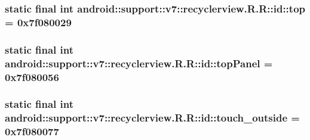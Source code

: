 \hypertarget{classandroid_1_1support_1_1v7_1_1recyclerview_1_1_r_1_1id_87a5e014a724cf78acf722314e58c9ba}{
\subsubsection[{top}]{\setlength{\rightskip}{0pt plus 5cm}static final int android::support::v7::recyclerview.R.R::id::top = 0x7f080029}}
\label{classandroid_1_1support_1_1v7_1_1recyclerview_1_1_r_1_1id_87a5e014a724cf78acf722314e58c9ba}


\hypertarget{classandroid_1_1support_1_1v7_1_1recyclerview_1_1_r_1_1id_61e1d074cb0a7aa0b64c60b9a116ee70}{
\subsubsection[{topPanel}]{\setlength{\rightskip}{0pt plus 5cm}static final int android::support::v7::recyclerview.R.R::id::topPanel = 0x7f080056}}
\label{classandroid_1_1support_1_1v7_1_1recyclerview_1_1_r_1_1id_61e1d074cb0a7aa0b64c60b9a116ee70}


\hypertarget{classandroid_1_1support_1_1v7_1_1recyclerview_1_1_r_1_1id_072fb7ee3a52e21ee8fb2507fb638bdb}{
\subsubsection[{touch\_\-outside}]{\setlength{\rightskip}{0pt plus 5cm}static final int android::support::v7::recyclerview.R.R::id::touch\_\-outside = 0x7f080077}}
\label{classandroid_1_1support_1_1v7_1_1recyclerview_1_1_r_1_1id_072fb7ee3a52e21ee8fb2507fb638bdb}


